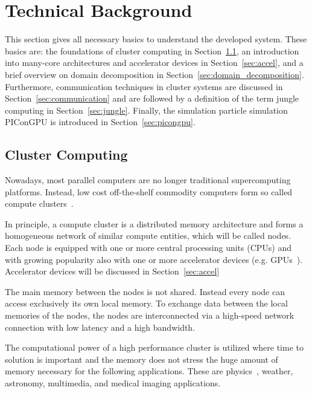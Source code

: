 \section{Technical Background}
\label{sec:technical_background}
This section gives all necessary basics to understand the
developed system.  These basics are: the foundations of
cluster computing in Section~\ref{sec:cluster}, an introduction into
many-core architectures and accelerator devices in
Section~\ref{sec:accel}, and a brief overview on domain decomposition in
Section~\ref{sec:domain_decomposition}. Furthermore, communication
techniques in cluster systems are discussed in
Section~\ref{sec:communication} and are followed by  a definition of the
term jungle computing in Section~\ref{sec:jungle}. Finally, the
simulation particle simulation PIConGPU is introduced in
Section~\ref{sec:picongpu}.

\subsection{Cluster Computing}
\label{sec:cluster}
Nowadays, most parallel computers are no longer traditional
supercomputing platforms. Instead, low cost off-the-shelf commodity
computers form so called compute clusters~\cite{ref:hpcc1}.

In principle, a compute cluster is a distributed memory architecture
and forms a homogeneous network of similar compute entities, which
will be called nodes. Each node is equipped with one or more central
processing units (CPUs) and with growing popularity also with one or
more accelerator devices (e.g. GPUs~\cite{ref:accel}). Accelerator
devices will be discussed in Section~\ref{sec:accel}

The main memory between the nodes is not shared. Instead every node
can access exclusively its own local memory.  To exchange data between
the local memories of the nodes, the nodes are interconnected via a
high-speed network connection with low latency and a high bandwidth.

The computational power of a high performance cluster is utilized
where time to solution is important and the memory does not stress the
huge amount of memory necessary for the following applications. These
are physics~\cite{ref:picongpu}, weather, astronomy, multimedia, and
medical imaging applications.



